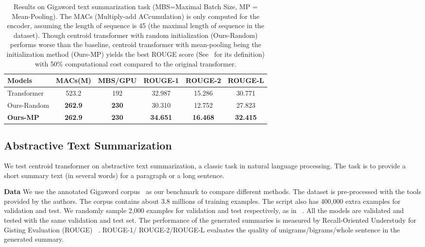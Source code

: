 \documentclass[english]{article}
\begin{document}
\begin{table*}[t]
    \centering
   \begin{tabular}{l|ccccc}
        \hline
        Models & MACs(M) & MBS/GPU & ROUGE-1 & ROUGE-2 & ROUGE-L\\
        \hline
        Transformer & 523.2 & 192 & 32.987 & 15.286 & 30.771\\
        Ours-Random  & \textbf{262.9} & \textbf{230} & 30.310 & 12.752 & 27.823 \\
        \textbf{Ours-MP}  & \textbf{262.9} & \textbf{230} & \textbf{34.651} & \textbf{16.468} & \textbf{32.415}\\ 
        \hline
    \end{tabular}
    \caption{Results on Gigaword text summarization task  (MBS=Maximal Batch Size, MP = Mean-Pooling). The MACs (Multiply-add ACcumulation) is only computed for the encoder, assuming the length of sequence is 45 (the maximal length of sequence in the dataset). Though centroid transformer with random initialization (Ours-Random) performs worse than the baseline, centroid transformer with mean-pooling being the initialization method (Ours-MP) yields the best ROUGE score (See~\citep{lin2004rouge} for its definition) with 50\% computational cost compared to the original transformer.
}
    \label{tab:nlp}
 
\end{table*}


\subsection{Abstractive Text Summarization}

We test centroid transformer on
abstractive text summarization,
a classic task in natural language  processing.
The task is to provide a short summary text (in several words) for a paragraph or a long sentence. 

\textbf{Data}  We use the annotated Gigaword corpus~\citep{rush2015neural} as our benchmark to compare different methods. The dataset is pre-processed with the tools provided by the authors. The corpus contains about 3.8 millions of training examples. The script also has 400,000 extra examples for validation and test. We randomly sample 2,000 examples for validation and test respectively, as in ~\cite{nallapati2016abstractive}. All the models are validated and tested with the same validation and test set. The performance of the generated summaries is measured by Recall-Oriented Understudy for Gisting Evaluation (ROUGE) ~\citep{lin2004rouge}. ROUGE-1/ ROUGE-2/ROUGE-L evaluates the quality of unigrams/bigrams/whole sentence in the generated summary.
\end{document}
